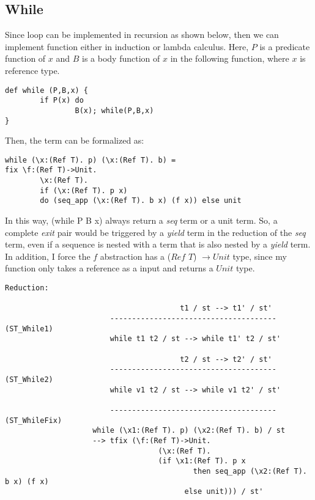 \subsection{While}
Since \while loop can be implemented in recursion as shown below, then we can implement \while function either in induction or lambda calculus. 
Here, $P$ is a predicate function of $x$ and $B$ is a body function of $x$ in the following function, where $x$ is reference type.
\begin{lstlisting}
def while (P,B,x) {
		if P(x) do
				B(x); while(P,B,x)
}
\end{lstlisting}
Then, the \while term can be formalized as:
\begin{lstlisting}
while (\x:(Ref T). p) (\x:(Ref T). b) =
fix \f:(Ref T)->Unit. 
		\x:(Ref T). 
		if (\x:(Ref T). p x) 
		do (seq_app (\x:(Ref T). b x) (f x)) else unit
\end{lstlisting}
In this way, (while P B x) always return a \textit{seq} term or a unit term. 
So, a complete \textit{exit} pair would be triggered by a \textit{yield} term in the reduction of the \textit{seq} term, even if a sequence is nested with a \while term that is also nested by a \textit{yield} term. In addition, I force the $f$ abstraction has a ($Ref$ $T$) $\rightarrow Unit$ type, since my \while function only takes a reference as a input and returns a $Unit$ type.
\begin{lstlisting}
Reduction:

										t1 / st --> t1' / st'
						-------------------------------------- (ST_While1)
						while t1 t2 / st --> while t1' t2 / st'
								
										t2 / st --> t2' / st'
						-------------------------------------- (ST_While2)
						while v1 t2 / st --> while v1 t2' / st'
								
						-------------------------------------- (ST_WhileFix)
					while (\x1:(Ref T). p) (\x2:(Ref T). b) / st 
					--> tfix (\f:(Ref T)->Unit. 
								   (\x:(Ref T). 
								   (if \x1:(Ref T). p x
										   then seq_app (\x2:(Ref T). b x) (f x)
									     else unit))) / st'
\end{lstlisting}


